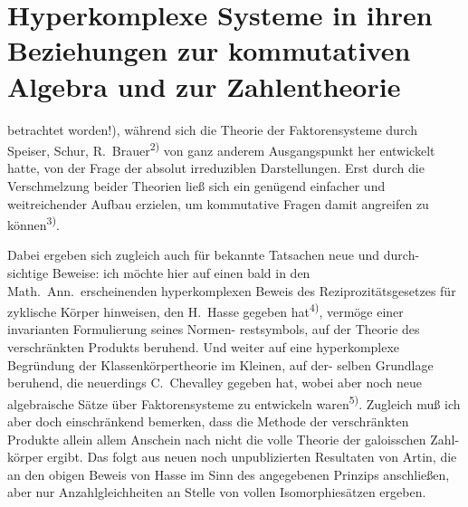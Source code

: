 \documentclass[12pt,a4paper]{article}
\theoremstyle{plain}
\begin{document}
\renewenvironment{noetherpaper}[4]{\newpage\section*{#1}\addcontentsline{toc}{section}{#1}\par\smallskip}{\par\medskip}




\section*{Hyperkomplexe Systeme in ihren Beziehungen zur kommutativen
Algebra und zur Zahlentheorie}
\label{sec:hyperkomplexe}


betrachtet worden!), w\"ahrend sich die Theorie der Faktorensysteme durch Speiser,
Schur, R.~Brauer\textsuperscript{2)} von ganz anderem Ausgangspunkt her entwickelt hatte, von der
Frage der absolut irreduziblen Darstellungen. Erst durch die Verschmelzung beider
Theorien lie\ss{} sich ein gen\"ugend einfacher und weitreichender Aufbau erzielen, um
kommutative Fragen damit angreifen zu k\"onnen\textsuperscript{3)}.

Dabei ergeben sich zugleich auch f\"ur bekannte Tatsachen neue und durch-
sichtige Beweise: ich m\"ochte hier auf einen bald in den Math.~Ann.\ erscheinenden
hyperkomplexen Beweis des Reziprozit\"atsgesetzes f\"ur zyklische K\"orper hinweisen,
den H.~Hasse gegeben hat\textsuperscript{4)}, verm\"oge einer invarianten Formulierung seines Normen-
restsymbols, auf der Theorie des verschr\"ankten Produkts beruhend. Und weiter auf
eine hyperkomplexe Begr\"undung der Klassenk\"orpertheorie im Kleinen, auf der-
selben Grundlage beruhend, die neuerdings C.~Chevalley gegeben hat, wobei aber
noch neue algebraische S\"atze \"uber Faktorensysteme zu entwickeln waren\textsuperscript{5)}. Zugleich
mu\ss{} ich aber doch einschr\"ankend bemerken, dass die Methode der verschr\"ankten
Produkte allein allem Anschein nach nicht die volle Theorie der galoisschen Zahl-
k\"orper ergibt. Das folgt aus neuen noch unpublizierten Resultaten von Artin, die an
den obigen Beweis von Hasse im Sinn des angegebenen Prinzips anschlie\ss{}en, aber
nur Anzahlgleichheiten an Stelle von vollen Isomorphies\"atzen ergeben.
\end{document}
